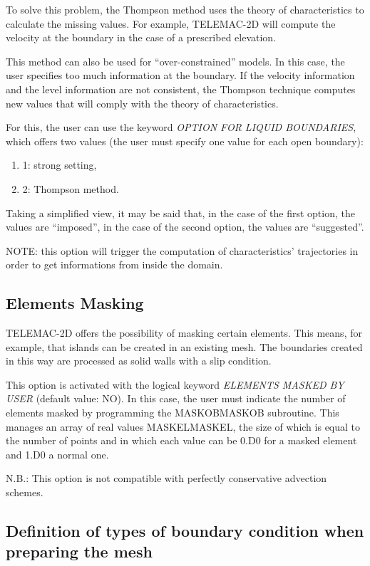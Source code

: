  To solve this problem, the Thompson method uses the theory of characteristics to calculate the missing values. For example, TELEMAC-2D will compute the velocity at the boundary in the case of a prescribed elevation.

 This method can also be used for ``over-constrained'' models. In this case, the user specifies too much information at the boundary. If the velocity information and the level information are not consistent, the Thompson technique computes new values that will comply with the theory of characteristics.

 For this, the user can use the keyword \textit{OPTION FOR LIQUID BOUNDARIES}, which offers two values (the user must specify one value for each open boundary):

\begin{enumerate}
\item  1: strong setting,

\item  2: Thompson method.
\end{enumerate}

 Taking a simplified view, it may be said that, in the case of the first option, the values are ``imposed'', in the case of the second option, the values are ``suggested''.

 NOTE: this option will trigger the computation of characteristics' trajectories in order to get informations from inside the domain.


\subsection{ Elements Masking}

 TELEMAC-2D offers the possibility of masking certain elements. This means, for example, that islands can be created in an existing mesh. The boundaries created in this way are processed as solid walls with a slip condition.

 This option is activated with the logical keyword \textit{ELEMENTS MASKED BY USER} (default value: NO). In this case, the user must indicate the number of elements masked by programming the MASKOBMASKOB subroutine. This manages an array of real values MASKELMASKEL, the size of which is equal to the number of points and in which each value can be 0.D0 for a masked element and 1.D0 a normal one.

 N.B.: This option is not compatible with perfectly conservative advection schemes.


\subsection{ Definition of types of boundary condition when preparing the mesh}

